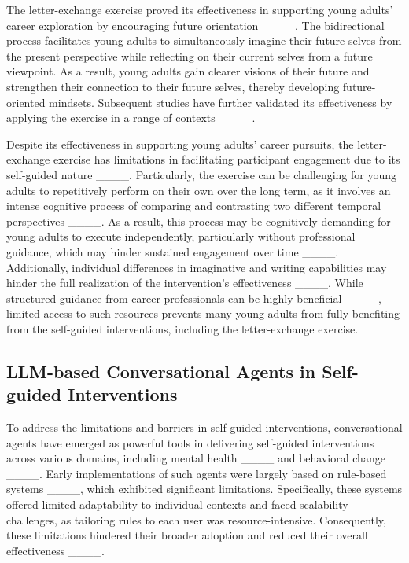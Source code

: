The letter-exchange exercise proved its effectiveness in supporting young adults' career exploration by encouraging future orientation ____. The bidirectional process facilitates young adults to simultaneously imagine their future selves from the present perspective while reflecting on their current selves from a future viewpoint. As a result, young adults gain clearer visions of their future and strengthen their connection to their future selves, thereby developing future-oriented mindsets. Subsequent studies have further validated its effectiveness by applying the exercise in a range of contexts ____.

Despite its effectiveness in supporting young adults’ career pursuits, the letter-exchange exercise has limitations in facilitating participant engagement due to its self-guided nature ____. Particularly, the exercise can be challenging for young adults to repetitively perform on their own over the long term, as it involves an intense cognitive process of comparing and contrasting two different temporal perspectives ____. As a result, this process may be cognitively demanding for young adults to execute independently, particularly without professional guidance, which may hinder sustained engagement over time ____. Additionally, individual differences in imaginative and writing capabilities may hinder the full realization of the intervention's effectiveness ____. While structured guidance from career professionals can be highly beneficial ____, limited access to such resources prevents many young adults from fully benefiting from the self-guided interventions, including the letter-exchange exercise.

\subsection{LLM-based Conversational Agents in Self-guided Interventions}

To address the limitations and barriers in self-guided interventions, conversational agents have emerged as powerful tools in delivering self-guided interventions across various domains, including mental health ____ and behavioral change ____. Early implementations of such agents were largely based on rule-based systems ____, which exhibited significant limitations. Specifically, these systems offered limited adaptability to individual contexts and faced scalability challenges, as tailoring rules to each user was resource-intensive. Consequently, these limitations hindered their broader adoption and reduced their overall effectiveness ____.

